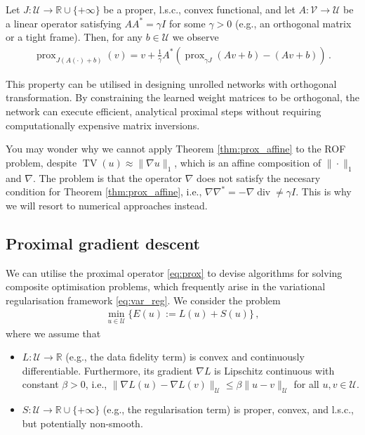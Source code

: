 \begin{thm}\label{thm:prox_affine}\normalfont
Let $J \colon \mathcal{U} \to \mathbb{R} \cup \{+\infty\}$ be a proper, l.s.c., convex functional, and let $A \colon \mathcal{V} \to \mathcal{U}$ be a linear operator satisfying $A A^* = \gamma I$ for some $\gamma > 0$ (e.g., an orthogonal matrix or a tight frame). Then, for any $b \in \mathcal{U}$ we observe
\begin{align*}
\operatorname{prox}_{J(A(\cdot) + b)}(v) = v + \frac{1}{\gamma} A^* \left( \operatorname{prox}_{\gamma J}(A v + b) - (A v + b) \right) \, .
\end{align*}
\end{thm}
This property can be utilised in designing unrolled networks with orthogonal transformation. By constraining the learned weight matrices to be orthogonal, the network can execute efficient, analytical proximal steps without requiring computationally expensive matrix inversions.

You may wonder why we cannot apply Theorem \ref{thm:prox_affine} to the ROF problem, despite $\operatorname{TV}(u) \approx \| \nabla u \|_1$, which is an affine composition of $\| \cdot \|_1$ and $\nabla$. The problem is that the operator $\nabla$ does not satisfy the necesary condition for Theorem \ref{thm:prox_affine}, i.e., $\nabla \nabla^\ast = -\nabla \operatorname{div} \neq \gamma I$. This is why we will resort to numerical approaches instead.

\subsection{Proximal gradient descent}
We can utilise the proximal operator \eqref{eq:prox} to devise algorithms for solving composite optimisation problems, which frequently arise in the variational regularisation framework \eqref{eq:var_reg}. We consider the problem
\begin{align}
\min_{u \in \mathcal{U}} \{ E(u) := L(u) + S(u) \} \, , \label{eq:composite_optimisation}
\end{align}
where we assume that
\begin{itemize}
\item $L \colon \mathcal{U} \to \mathbb{R}$ (e.g., the data fidelity term) is convex and continuously differentiable. Furthermore, its gradient $\nabla L$ is Lipschitz continuous with constant $\beta > 0$, i.e., $\| \nabla L(u) - \nabla L(v) \|_{\mathcal{U}} \leq \beta \| u - v \|_{\mathcal{U}}$ for all $u,v \in \mathcal{U}$.
\item $S \colon \mathcal{U} \to \mathbb{R} \cup \{+\infty\}$ (e.g., the regularisation term) is proper, convex, and l.s.c., but potentially non-smooth.
\end{itemize}

